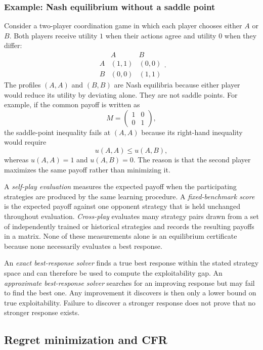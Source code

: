 \subsubsection{Example: Nash equilibrium without a saddle point}
\label{app:nash-without-saddle}

Consider a two-player coordination game in which each player chooses either $A$ or $B$. Both players receive utility $1$ when their actions agree and utility $0$ when they differ:
\[
    \begin{array}{c|cc}
        & A & B\\ \hline
        A & (1,1) & (0,0)\\
        B & (0,0) & (1,1)
    \end{array}.
\]
The profiles $(A,A)$ and $(B,B)$ are Nash equilibria because either player would reduce its utility by deviating alone. They are not saddle points. For example, if the common payoff is written as
\[
    M=
    \begin{pmatrix}
        1&0\\
        0&1
    \end{pmatrix},
\]
the saddle-point inequality fails at $(A,A)$ because its right-hand inequality would require
\[
    u(A,A)\leq u(A,B),
\]
whereas $u(A,A)=1$ and $u(A,B)=0$. The reason is that the second player maximizes the same payoff rather than minimizing it.

A \emph{self-play evaluation} measures the expected payoff when the participating strategies are produced by the same learning procedure. A \emph{fixed-benchmark score} is the expected payoff against one opponent strategy that is held unchanged throughout evaluation. \emph{Cross-play} evaluates many strategy pairs drawn from a set of independently trained or historical strategies and records the resulting payoffs in a matrix. None of these measurements alone is an equilibrium certificate because none necessarily evaluates a best response.

An \emph{exact best-response solver} finds a true best response within the stated strategy space and can therefore be used to compute the exploitability gap. An \emph{approximate best-response solver} searches for an improving response but may fail to find the best one. Any improvement it discovers is then only a lower bound on true exploitability. Failure to discover a stronger response does not prove that no stronger response exists.


\subsection{Regret minimization and CFR}
\label{app:regret-cfr}

